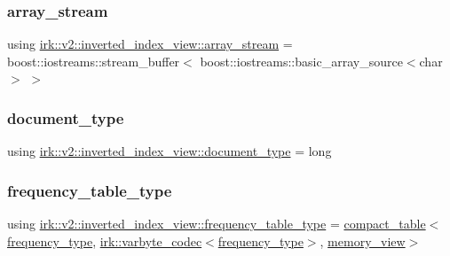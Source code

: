 \subsubsection{\texorpdfstring{array\+\_\+stream}{array\_stream}}
{\footnotesize\ttfamily using \mbox{\hyperlink{classirk_1_1v2_1_1inverted__index__view_a0dd0327febf8c41ecfd339374c47ce5f}{irk\+::v2\+::inverted\+\_\+index\+\_\+view\+::array\+\_\+stream}} =  boost\+::iostreams\+::stream\+\_\+buffer$<$ boost\+::iostreams\+::basic\+\_\+array\+\_\+source$<$char$>$ $>$}

\mbox{\label{classirk_1_1v2_1_1inverted__index__view_a8441dcf60be934782fdaa9411723700b}} 
\subsubsection{\texorpdfstring{document\+\_\+type}{document\_type}}
{\footnotesize\ttfamily using \mbox{\hyperlink{classirk_1_1v2_1_1inverted__index__view_a8441dcf60be934782fdaa9411723700b}{irk\+::v2\+::inverted\+\_\+index\+\_\+view\+::document\+\_\+type}} =  long}

\mbox{\label{classirk_1_1v2_1_1inverted__index__view_ab247a56cfb430693e05ee2ff1d10221e}} 
\subsubsection{\texorpdfstring{frequency\+\_\+table\+\_\+type}{frequency\_table\_type}}
{\footnotesize\ttfamily using \mbox{\hyperlink{classirk_1_1v2_1_1inverted__index__view_ab247a56cfb430693e05ee2ff1d10221e}{irk\+::v2\+::inverted\+\_\+index\+\_\+view\+::frequency\+\_\+table\+\_\+type}} =  \mbox{\hyperlink{classirk_1_1compact__table}{compact\+\_\+table}}$<$\mbox{\hyperlink{classirk_1_1v2_1_1inverted__index__view_ab52405d4c17e6e82893d2650a56e0a32}{frequency\+\_\+type}}, \mbox{\hyperlink{structirk_1_1varbyte__codec}{irk\+::varbyte\+\_\+codec}}$<$\mbox{\hyperlink{classirk_1_1v2_1_1inverted__index__view_ab52405d4c17e6e82893d2650a56e0a32}{frequency\+\_\+type}}$>$, \mbox{\hyperlink{classirk_1_1memory__view}{memory\+\_\+view}}$>$}

